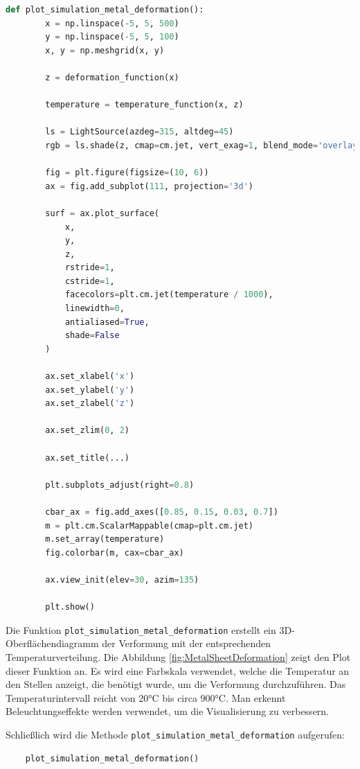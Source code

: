 \begin{lstlisting}[language=Python, caption={Plotten des Verformungsverfahren}, label={lst:PlotMetalDeformation}]
    def plot_simulation_metal_deformation():
        x = np.linspace(-5, 5, 500)
        y = np.linspace(-5, 5, 100)
        x, y = np.meshgrid(x, y)
    
        z = deformation_function(x)
    
        temperature = temperature_function(x, z)
    
        ls = LightSource(azdeg=315, altdeg=45)
        rgb = ls.shade(z, cmap=cm.jet, vert_exag=1, blend_mode='overlay')
    
        fig = plt.figure(figsize=(10, 6))
        ax = fig.add_subplot(111, projection='3d')
    
        surf = ax.plot_surface(
            x,
            y,
            z,
            rstride=1,
            cstride=1,
            facecolors=plt.cm.jet(temperature / 1000),
            linewidth=0,
            antialiased=True,
            shade=False
        )
    
        ax.set_xlabel('x')
        ax.set_ylabel('y')
        ax.set_zlabel('z')
    
        ax.set_zlim(0, 2)
    
        ax.set_title(...)
    
        plt.subplots_adjust(right=0.8)
    
        cbar_ax = fig.add_axes([0.85, 0.15, 0.03, 0.7])
        m = plt.cm.ScalarMappable(cmap=plt.cm.jet)
        m.set_array(temperature)
        fig.colorbar(m, cax=cbar_ax)
    
        ax.view_init(elev=30, azim=135)
    
        plt.show()
\end{lstlisting}
Die Funktion \texttt{plot\_simulation\_metal\_deformation} erstellt ein 3D-Oberflächendiagramm der Verformung mit der entsprechenden Temperaturverteilung. Die Abbildung \ref{fig:MetalSheetDeformation} zeigt den Plot dieser Funktion an. Es wird eine Farbskala verwendet, welche die Temperatur an den Stellen anzeigt, die benötigt wurde, um die Verformung durchzuführen. Das Temperaturintervall reicht von 20°C bis circa 900°C. Man erkennt  Beleuchtungseffekte werden verwendet, um die Visualisierung zu verbessern.

Schließlich wird die Methode \texttt{plot\_simulation\_metal\_deformation} aufgerufen:
\begin{lstlisting}
    plot_simulation_metal_deformation()
\end{lstlisting}


